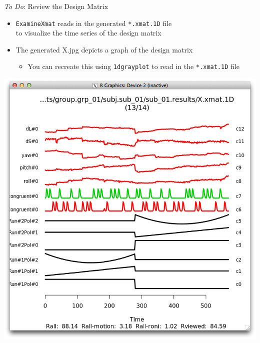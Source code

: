 \documentclass[t,12pt]{beamer}
\begin{document}
\begin{frame}{\emph{To Do}: Review the Design Matrix}
\vspace{10pt}
\begin{itemize}
\setlength\itemsep{1em}
\item \texttt{ExamineXmat} reads in the generated \texttt{*.xmat.1D} file \\ to visualize the time series of the design matrix
\item The generated X.jpg depicts a graph of the design matrix 
\vspace{4pt}
\begin{itemize}
\item You can recreate this using \texttt{1dgrayplot} to read in the \texttt{*.xmat.1D} file
\end{itemize}
\end{itemize}
\vspace{4pt}
\centering
\begin{minipage}{0.35\textwidth}
\includegraphics[width=\textwidth]{images/time_Xmat.png}
\end{minipage}
\begin{minipage}{0.30\textwidth}

\end{minipage}
\end{frame}
\end{document}
